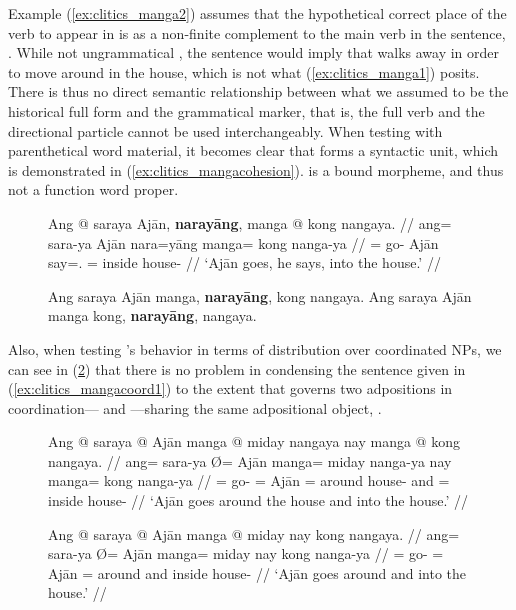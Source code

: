 Example (\ref{ex:clitics_manga2}) assumes that the hypothetical correct place
of the verb  to appear in is as a non-finite complement
to the main verb in the sentence, . While not
ungrammatical , the sentence would imply that 
walks away in order to move around in the house, which is not what
(\ref{ex:clitics_manga1}) posits. There is thus no direct semantic relationship
between what we assumed to be the historical full form and the grammatical
marker, that is, the full verb and the directional particle cannot be used
interchangeably. When testing with parenthetical word material, it becomes
clear that  forms a syntactic unit, which is
demonstrated in (\ref{ex:clitics_mangacohesion}).  is a bound
morpheme, and thus not a function word proper.

\begin{figure}
\pex\label{ex:clitics_mangacohesion}
\a\label{ex:clitics_mangacohesion1}\begingl
	\gla Ang @ saraya Ajān, \textbf{narayāng}, manga @ kong nangaya. //
	\glb ang= sara-ya Ajān nara=yāng manga= kong nanga-ya //
	\glc \AgtT{}= go-\TsgM{} Ajān say=\TsgM{}.\Aarg{} \Dir{}= inside 
		house-\Loc{} //
	\glft `Ajān goes, he says, into the house.' //
\endgl

\a\label{ex:clitics_mangacohesion2}
	\ljudge{*} Ang saraya Ajān manga, \textbf{narayāng}, kong nangaya.
\a\label{ex:clitics_mangacohesion3}
	Ang saraya Ajān manga kong, \textbf{narayāng}, nangaya.
\xe
\end{figure}

Also, when testing 's behavior in terms of distribution over
coordinated NPs, we can see in (\ref{ex:clitics_mangacoord2}) that there is no
problem in condensing the sentence given in (\ref{ex:clitics_mangacoord1}) to
the extent that  governs two adpositions in
coordination--- and
---sharing the same adpositional object,
.

\begin{figure}
\pex\label{ex:clitics_mangacoord}
\a\label{ex:clitics_mangacoord1}\begingl
	\gla Ang @ saraya {} @ Ajān manga @ miday nangaya nay manga @ kong 
		nangaya. //
	\glb ang= sara-ya Ø= Ajān manga= miday nanga-ya nay manga= kong nanga-ya //
	\glc \AgtT{}= go-\TsgM{} \Top{}= Ajān \Dir{}= around house-\Loc{} and
		\Dir{}= inside house-\Loc{} //
	\glft `Ajān goes around the house and into the house.' //
\endgl

\a\label{ex:clitics_mangacoord2}\begingl
	\gla Ang @ saraya {} @ Ajān manga @ miday nay kong nangaya. //
	\glb ang= sara-ya Ø= Ajān manga= miday nay kong nanga-ya //
	\glc \AgtT{}= go-\TsgM{} \Top{}= Ajān \Dir{}= around and inside
		house-\Loc{} //
	\glft `Ajān goes around and into the house.' //
\endgl
\xe
\end{figure}

